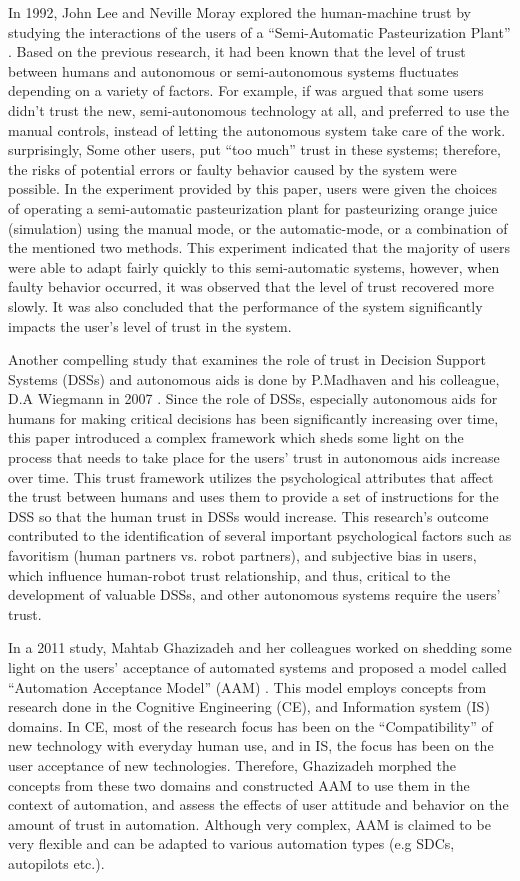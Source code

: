 \documentclass[runningheads,a4paper]{llncs}
\begin{document}
In 1992, John Lee and Neville Moray explored the human-machine trust by studying the interactions of the users of a ``Semi-Automatic Pasteurization Plant'' \cite{lee1992trust}. Based on the previous research, it had been known that the level of trust between humans and autonomous or semi-autonomous systems fluctuates depending on a variety of factors. For example, if was argued that some users didn't trust the new, semi-autonomous technology at all, and preferred to use the manual controls, instead of letting the autonomous system take care of the work. surprisingly, Some other users, put ``too much'' trust in these systems; therefore, the risks of potential errors or faulty behavior caused by the system were possible. In the experiment provided by this paper, users were given the choices of operating a semi-automatic pasteurization plant for pasteurizing orange juice (simulation) using the manual mode, or the automatic-mode, or a combination of the mentioned two methods. This experiment indicated that the majority of users were able to adapt fairly quickly to this semi-automatic systems, however, when faulty behavior occurred, it was observed that the level of trust recovered more slowly. It was also concluded that the performance of the system significantly impacts the user's level of trust in the system.

Another compelling study that examines the role of trust in Decision Support Systems (DSSs) and autonomous aids is done by P.Madhaven and his colleague, D.A Wiegmann in 2007 \cite{madhavan2007similarities}. Since the role of DSSs, especially autonomous aids for humans for making critical decisions has been significantly increasing over time, this paper introduced a complex framework which sheds some light on the process that needs to take place for the users' trust in autonomous aids increase over time. This trust framework utilizes the psychological attributes that affect the trust between humans and uses them to provide a set of instructions for the DSS so that the human trust in DSSs would increase. This research's outcome contributed to the identification of several important psychological factors such as favoritism (human partners vs. robot partners), and subjective bias in users, which influence human-robot trust relationship, and thus, critical to the development of valuable DSSs, and other autonomous systems require the users' trust.

In a 2011 study, Mahtab Ghazizadeh and her colleagues worked on shedding some light on the users' acceptance of automated systems and proposed a model called ``Automation Acceptance Model'' (AAM) \cite{ghazizadeh2012extending}. This model employs concepts from research done in the Cognitive Engineering (CE), and Information system (IS) domains. In CE, most of the research focus has been on the ``Compatibility'' of new technology with everyday human use, and in IS, the focus has been on the user acceptance of new technologies. Therefore, Ghazizadeh morphed the concepts from these two domains and constructed AAM to use them in the context of automation, and assess the effects of user attitude and behavior on the amount of trust in automation. Although very complex, AAM is claimed to be very flexible and can be adapted to various automation types (e.g SDCs, autopilots etc.).
\end{document}
